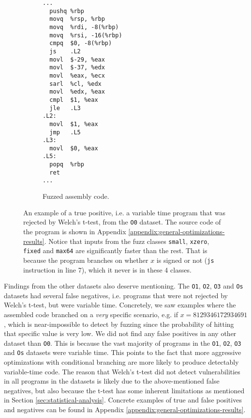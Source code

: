 \begin{figure}[H]
    \begin{subfigure}[b]{0.35\textwidth}
      \begin{lstlisting}[style=defstyle,language={[x86masm]Assembler},basicstyle=\small\ttfamily,breaklines=true]
...
  pushq	%rbp
  movq	%rsp, %rbp
  movq	%rdi, -8(%rbp)
  movq	%rsi, -16(%rbp)
  cmpq	$0, -8(%rbp)
  js	.L2
  movl	$-29, %eax
  movl	$-37, %edx
  movl	%eax, %ecx
  sarl	%cl, %edx
  movl	%edx, %eax
  cmpl	$1, %eax
  jle	.L3
.L2:
  movl	$1, %eax
  jmp	.L5
.L3:
  movl	$0, %eax
.L5:
  popq	%rbp
  ret
...\end{lstlisting} 
       \caption{Fuzzed assembly code.}
  \end{subfigure}
  \caption{An example of a true positive, i.e. a variable time program that was rejected by Welch's t-test, from the \texttt{O0} dataset. 
  The source code of the program is shown in Appendix \ref{appendix:general-optimizations-results}. 
  Notice that inputs from the fuzz classes \texttt{small}, \texttt{xzero}, \texttt{fixed} and \texttt{max64} are significantly faster than the rest.
  That is because the program branches on whether $x$ is signed or not (\texttt{js} instruction in line 7), which it never is in these 4 classes.}
  \label{fig:general-optimizations-O0-true-positive}
\end{figure}

Findings from the other datasets also deserve mentioning.
The \texttt{O1}, \texttt{O2}, \texttt{O3} and \texttt{Os} datasets had several false negatives, i.e. programs that were not rejected by Welch's t-test, but were variable time.
Concretely, we saw examples where the assembled code branched on a \textit{very} specific scenario, e.g. if $x = 8129346172934691$, which is near-impossible to detect by fuzzing since the probability of hitting that specific value is very low.
We did not find any false positives in any other dataset than \texttt{O0}.
This is because the vast majority of programs in the \texttt{O1}, \texttt{O2}, \texttt{O3} and \texttt{Os} datasets were variable time.
This points to the fact that more aggressive optimizations with conditional branching are more likely to produce detectably variable-time code.
The reason that Welch's t-test did not detect vulnerabilities in all programs in the datasets is likely due to the above-mentioned false negatives, but also because the t-test has some inherent limitations as mentioned in Section \ref{sec:statistical-analysis}.
Concrete examples of true and false positives and negatives can be found in Appendix \ref{appendix:general-optimizations-results}.

